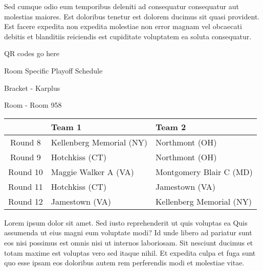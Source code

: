 \documentclass{article}%
\begin{document}
\newline%
Sed cumque odio eum temporibus deleniti ad consequatur consequatur aut molestias maiores. Est doloribus tenetur est dolorem ducimus sit quasi provident. Est facere expedita non expedita molestiae non error magnam vel obcaecati debitis et blanditiis reiciendis est cupiditate voluptatem ea soluta consequatur.%
\vspace*{140pt}%
\begin{center}%
\begin{Huge}%
QR codes go here%
\end{Huge}%
\end{center}%
\newpage%
\begin{center}%
\begin{Huge}%
Room Specific Playoff Schedule%
\end{Huge}%
\vspace*{8pt}%
\linebreak%
\begin{Large}%
Bracket {-} Karplus%
\end{Large}%
\vspace*{8pt}%
\linebreak%
\vspace*{8pt}%
\begin{Large}%
Room {-} Room 958%
\end{Large}%
\end{center}%
%
\begin{tabularx}{\textwidth}{|c|Y|Y|}%
\hline%
&Team 1&Team 2\\%
\hline%
Round 8&Kellenberg Memorial (NY)&Northmont (OH)\\%
Round 9&Hotchkiss (CT)&Northmont (OH)\\%
Round 10&Maggie Walker A (VA)&Montgomery Blair C (MD)\\%
Round 11&Hotchkiss (CT)&Jamestown (VA)\\%
Round 12&Jamestown (VA)&Kellenberg Memorial (NY)\\%
\hline%
\end{tabularx}%
\vspace*{8pt}%
\newline%
Lorem ipsum dolor sit amet. Sed iusto reprehenderit ut quis voluptas ea Quis assumenda ut eius magni eum voluptate modi? Id unde libero ad pariatur sunt eos nisi possimus est omnis nisi ut internos laboriosam. Sit nesciunt ducimus et totam maxime est voluptas vero sed itaque nihil. Et expedita culpa et fuga sunt quo esse ipsam eos doloribus autem rem perferendis modi et molestiae vitae.\newline%
\end{document}
